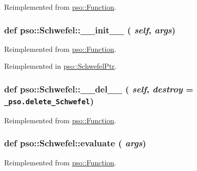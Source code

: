 Reimplemented from \hyperlink{classpso_1_1Function_959f07a6de4f333461fdb0261e6c25ae}{pso::Function}.\hypertarget{classpso_1_1Schwefel_923da07160f0471b0797a092dc53f05f}{
\subsubsection{\setlength{\rightskip}{0pt plus 5cm}def pso::Schwefel::\_\-\_\-init\_\-\_\- ( {\em self}, \/   {\em args})}}
\label{classpso_1_1Schwefel_923da07160f0471b0797a092dc53f05f}




Reimplemented from \hyperlink{classpso_1_1Function_6874097c6476dc85af64b40e76a807e9}{pso::Function}.

Reimplemented in \hyperlink{classpso_1_1SchwefelPtr_073a6a9bb2a9778745ac521f508634a0}{pso::SchwefelPtr}.\hypertarget{classpso_1_1Schwefel_934aebcd5b45f4fda0b97076b4db949c}{
\subsubsection{\setlength{\rightskip}{0pt plus 5cm}def pso::Schwefel::\_\-\_\-del\_\-\_\- ( {\em self}, \/   {\em destroy} = {\tt \_\-pso.delete\_\-Schwefel})}}
\label{classpso_1_1Schwefel_934aebcd5b45f4fda0b97076b4db949c}




Reimplemented from \hyperlink{classpso_1_1Function_c80bd40fcf4a956e5732ed099bccc598}{pso::Function}.\hypertarget{classpso_1_1Schwefel_ffe14ee462d46bf76e19065c755bb013}{
\subsubsection{\setlength{\rightskip}{0pt plus 5cm}def pso::Schwefel::evaluate ( {\em args})}}
\label{classpso_1_1Schwefel_ffe14ee462d46bf76e19065c755bb013}




Reimplemented from \hyperlink{classpso_1_1Function_7c958ea6d942a89ae219b872b4d73541}{pso::Function}.

